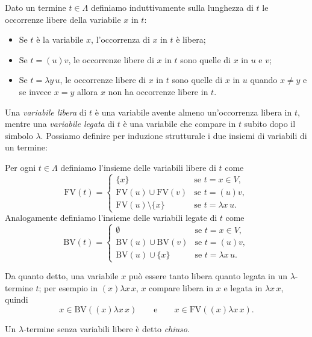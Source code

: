 \begin{defi}
Dato un termine $t\in\Lambda$ definiamo induttivamente sulla lunghezza di $t$ le occorrenze libere della variabile $x$ in $t$:
\begin{itemize}
    \item Se $t$ è la variabile $x$, l'occorrenza di $x$ in $t$ è libera;
    \item Se $t=(u)v$, le occorrenze libere di $x$ in $t$ sono quelle di $x$ in $u$ e $v$;
    \item Se $t=\lambda y\,u$, le occorrenze libere di $x$ in $t$ sono quelle di $x$ in $u$ quando $x\neq y$ e se invece $x=y$ allora $x$ non ha occorrenze libere in $t$.
\end{itemize}
\end{defi}

Una \emph{variabile libera} di $t$ è una variabile avente almeno un'occorrenza libera in $t$, mentre una \emph{variabile legata} di $t$ è una variabile che compare in $t$ subito dopo il simbolo $\lambda$. Possiamo definire per induzione strutturale i due insiemi di variabili di un termine:

\begin{defi}
Per ogni $t\in\Lambda$ definiamo l'insieme delle variabili libere di $t$ come
\[
\mathrm{FV}(t)=
\begin{cases}
\{x\} & \text{se } t=x\in V,\\
\mathrm{FV}(u)\cup\mathrm{FV}(v) & \text{se } t=(u)v,\\
\mathrm{FV}(u)\setminus\{x\} & \text{se } t=\lambda x\,u.
\end{cases}
\]
Analogamente definiamo l'insieme delle variabili legate di $t$ come
\[
\mathrm{BV}(t)=
\begin{cases}
\emptyset & \text{se } t=x\in V,\\
\mathrm{BV}(u)\cup\mathrm{BV}(v) & \text{se } t=(u)v,\\
\mathrm{BV}(u)\cup\{x\} & \text{se } t=\lambda x\,u.
\end{cases}
\]
\end{defi}

Da quanto detto, una variabile $x$ può essere tanto libera quanto legata in un $\lambda$-termine $t$; per esempio in $(x)\lambda x\,x$, $x$ compare libera in $x$ e legata in $\lambda x\,x$, quindi
\[
x\in\mathrm{BV}((x)\lambda x\,x)\qquad\text{e}\qquad x\in\mathrm{FV}((x)\lambda x\,x).
\]

\begin{defi}
Un $\lambda$-termine senza variabili libere è detto \emph{chiuso}.
\end{defi}

